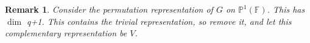 \documentclass[letterpaper, leqno, 12pt]{article}
\newcommand{\fin}{\qquad \quad \hfill \framebox[1.75mm][l]{\,}}
\newcommand{\Res}{\mbox{Res}}
\newcommand{\tmatrix}[4]{\left(  \begin{array}{cc}
#1 & #2 \\ 
#3 & #4
\end{array} \right) }
\theoremstyle{stdthm}
\newtheorem{lem}[thm]{Lemma}
\theoremstyle{stddef}
\newtheorem{defn}[thm]{Definition}
\newtheorem{rem}[thm]{Remark} %
\theoremstyle{stdnonum}
\theoremstyle{stdqands}
\theoremstyle{stdbold}
\begin{document}






\begin{rem}
Consider the permutation representation of $G$ on $\mathbb{P}^1(\mathbb{F})$. This has $\dim$ q+1. This contains the trivial representation, so remove it, and let this complementary representation be $V$. 
\end{rem}
\end{document}
